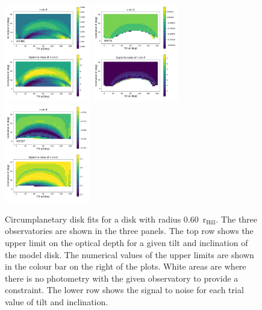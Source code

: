 \documentclass[longauth]{aa} %
\newcommand{\rhill}{$\mathrm{r_{Hill}}$} %
\begin{document}
\begin{figure}[htb]       
    \includegraphics[width=0.333\textwidth]{diskfit_BRING_060.pdf}   
    \includegraphics[width=0.333\textwidth]{diskfit_BRITE_060.pdf}
    \includegraphics[width=0.333\textwidth]{diskfit_ASTEP_060.pdf}
    \caption{Circumplanetary disk fits for a disk with radius 0.60\ \rhill. The three observatories are shown in the three panels. The top row shows the upper limit on the optical depth for a given tilt and inclination of the model disk. The numerical values of the upper limits are shown in the colour bar on the right of the plots. White areas are where there is no photometry with the given observatory to provide a constraint. The lower row shows the signal to noise for each trial value of tilt and inclination.}
    \label{cpd60}
\end{figure}
\end{document}
